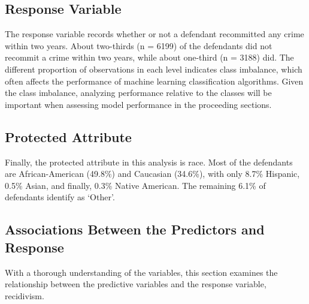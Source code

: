 \documentclass[12pt, twoside]{amherstthesis}
\begin{document}
\hypertarget{response}{%
\subsection{Response Variable}\label{response}}

The response variable records whether or not a defendant recommitted any crime within two years. About two-thirds (n = 6199) of the defendants did not recommit a crime within two years, while about one-third (n = 3188) did. The different proportion of observations in each level indicates class imbalance, which often affects the performance of machine learning classification algorithms. Given the class imbalance, analyzing performance relative to the classes will be important when assessing model performance in the proceeding sections.

\hypertarget{protectedattribute}{%
\subsection{Protected Attribute}\label{protectedattribute}}

Finally, the protected attribute in this analysis is race. Most of the defendants are African-American (49.8\%) and Caucasian (34.6\%), with only 8.7\% Hispanic, 0.5\% Asian, and finally, 0.3\% Native American. The remaining 6.1\% of defendants identify as `Other'.

\hypertarget{bivariateanalysis}{%
\subsection{Associations Between the Predictors and Response}\label{bivariateanalysis}}

With a thorough understanding of the variables, this section examines the relationship between the predictive variables and the response variable, recidivism.
\end{document}
